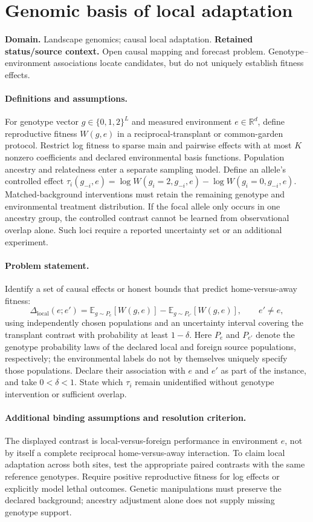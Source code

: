 \documentclass[11pt]{article}
\begin{document}
\section*{Genomic basis of local adaptation}
\label{prob:172}
\label{rank:162}
\par\smallskip

\noindent\textbf{Domain.} Landscape genomics; causal local adaptation. \quad \textbf{Retained status/source context.} Open causal mapping and forecast problem. Genotype--environment associations locate candidates, but do not uniquely establish fitness effects.
\paragraph{Definitions and assumptions.} For genotype vector $g\in\{0,1,2\}^L$ and measured environment $e\in\mathbb{R}^d$, define reproductive fitness $W(g,e)$ in a reciprocal-transplant or common-garden protocol. Restrict log fitness to sparse main and pairwise effects with at most $K$ nonzero coefficients and declared environmental basis functions. Population ancestry and relatedness enter a separate sampling model. Define an allele's controlled effect $\tau_i(g_{-i},e)=\log W(g_i=2,g_{-i},e)-\log W(g_i=0,g_{-i},e)$. Matched-background interventions must retain the remaining genotype and environmental treatment distribution. If the focal allele only occurs in one ancestry group, the controlled contrast cannot be learned from observational overlap alone. Such loci require a reported uncertainty set or an additional experiment.
\paragraph{Problem statement.} Identify a set of causal effects or honest bounds that predict home-versus-away fitness:
\[
 \Delta_{\mathrm{local}}(e;e')=
 \mathbb{E}_{g\sim P_e}[W(g,e)]-
 \mathbb{E}_{g\sim P_{e'}}[W(g,e)],\qquad e'\ne e,
\]
using independently chosen populations and an uncertainty interval covering the transplant contrast with probability at least $1-\delta$. Here $P_e$ and $P_{e'}$ denote the genotype probability laws of the declared local and foreign source populations, respectively; the environmental labels do not by themselves uniquely specify those populations. Declare their association with $e$ and $e'$ as part of the instance, and take $0<\delta<1$. State which $\tau_i$ remain unidentified without genotype intervention or sufficient overlap.
\paragraph{Additional binding assumptions and resolution criterion.} The displayed contrast is local-versus-foreign performance in environment $e$, not by itself a complete reciprocal home-versus-away interaction. To claim local adaptation across both sites, test the appropriate paired contrasts with the same reference genotypes. Require positive reproductive fitness for log effects or explicitly model lethal outcomes. Genetic manipulations must preserve the declared background; ancestry adjustment alone does not supply missing genotype support.
\end{document}
